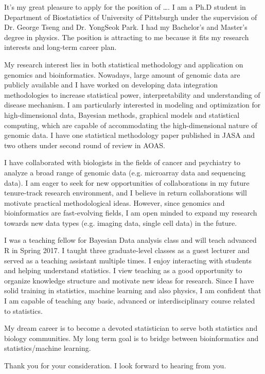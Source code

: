 \documentclass[10pt,stdletter,orderfromtodate]{newlfm}
\begin{document}
\begin{newlfm}

It's my great pleasure to apply for the position of \ldots{}.
I am a Ph.D student in Department of Biostatistics of University of Pittsburgh
under the supervision of Dr. George Tseng and Dr. YongSeok Park.
I had my Bachelor's and Master's degree in physics.
The position is attracting to me because it fits my research interests and long-term career plan.

My research interest lies in both statistical methodology and application on genomics and bioinformatics.
Nowadays, large amount of genomic data are publicly available and
I have worked on developing data integration methodologies to increase statistical power, interpretability and understanding of disease mechanism. 
I am particularly interested in modeling and optimization for high-dimensional data, Bayesian methods, graphical models and statistical computing,
which are capable of accommodating the high-dimensional nature of genomic data.
I have one statistical methodology paper published in JASA and two others under second round of review in AOAS.

I have collaborated with biologists in the fields of cancer and psychiatry to analyze a broad range of genomic data (e.g. microarray data and sequencing data).
I am eager to seek for new opportunities of collaborations in my future tenure-track research environment, 
and I believe in return collaborations will motivate practical methodological ideas.
However, since genomics and bioinformatics are fast-evolving fields,
I am open minded to expand my research towards new data types (e.g. imaging data, single cell data) in the future.

I was a teaching fellow for Bayesian Data analysis class and will teach advanced R in Spring 2017.
I taught three graduate-level classes as a guest lecturer and served as a teaching assistant multiple times.
I enjoy interacting with students and helping understand statistics.
I view teaching as a good opportunity to organize knowledge structure and motivate new ideas for research. 
Since I have solid training in statistics, machine learning and also physics, 
I am confident that I am capable of teaching any basic, advanced or interdisciplinary course related to statistics.

My dream career is to become a devoted statistician to serve both statistics and biology communities.
My long term goal is to bridge between bioinformatics and statistics/machine learning.


Thank you for your consideration.  
I look forward to hearing from you.

\end{newlfm}
\end{document}
